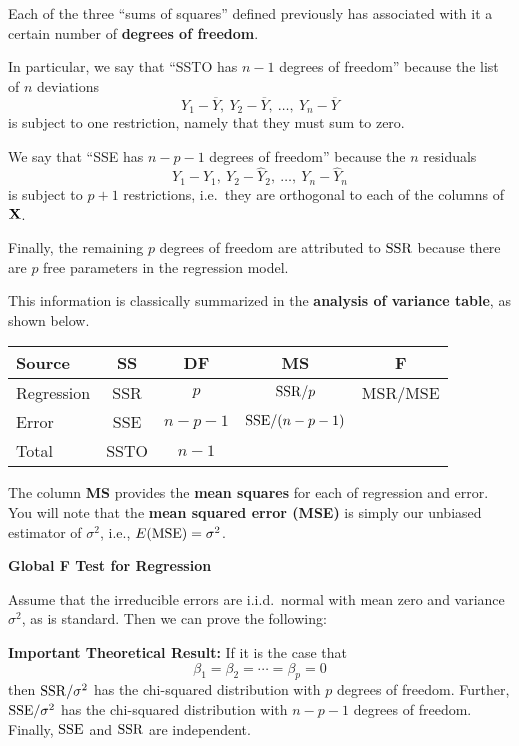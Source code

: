 \documentclass{report}
\newcommand{\hpad}{{\hspace{.15in}}}
\begin{document}
Each of the three ``sums of squares'' defined previously has associated
with it a certain number of {\bf degrees of freedom}.

In particular, we say that ``SSTO has $n-1$ degrees of freedom'' because
the list of $n$ deviations
\[
  Y_1 - \overline{Y}, \:Y_2 - \overline{Y}, \:\ldots,\: Y_n - \overline{Y}
\]
is subject to one restriction, namely that they must sum to zero.

We say that ``SSE has $n-p-1$ degrees of freedom'' because the $n$ residuals
\[
   Y_1 - \widehat Y_1, \: Y_2 - \widehat Y_2, \:\ldots,\: Y_n - \widehat Y_n
\]
is subject to $p+1$ restrictions, i.e.~they are orthogonal to each of the columns
of ${\bf X}$.

Finally, the remaining $p$ degrees of freedom are attributed to ${\rm SSR}$ because
there are $p$ free parameters in the regression model.

\newpage
This information is classically summarized in the {\bf analysis of variance table},
as shown below.

\begin{center}
\begin{tabular}{lcccc}
{\bf Source} & \hpad {\bf SS} \hpad & \hpad {\bf DF} \hpad & \hpad {\bf MS} \hpad & \hpad {\bf F} \\
\hline
Regression & \hpad SSR \hpad & \hpad $p$ \hpad & \hpad ${\rm SSR}/p$ \hpad & \hpad MSR/MSE \\
Error & \hpad SSE \hpad & \hpad $n-p-1$ \hpad & \hpad ${\rm SSE}/(n-p-1)$ \hpad & \\
\hline
Total & \hpad SSTO \hpad & \hpad $n-1$ \hpad & & \\
\end{tabular}
\end{center}

The column {\bf MS} provides the {\bf mean squares} for each of regression and error.
You will note that the {\bf mean squared error (MSE)} is simply our unbiased estimator
of $\sigma^2$, i.e., $E({\rm MSE}) = \sigma^2$.

\newpage
{\bf Global F Test for Regression}

Assume that the irreducible errors are i.i.d.~normal with mean
zero and variance $\sigma^2$, as is standard.
Then we can prove the following:

{\bf Important Theoretical Result:} 
If it is the case that
\[
   \beta_1 = \beta_2 = \cdots = \beta_{p} = 0
\]
then ${\rm SSR}/{\sigma^2}$ has the chi-squared distribution with
$p$ degrees of freedom. Further, ${\rm SSE}/{\sigma^2}$ has the
chi-squared distribution with $n-p-1$ degrees of freedom. Finally,
${\rm SSE}$ and ${\rm SSR}$ are independent.
\end{document}
